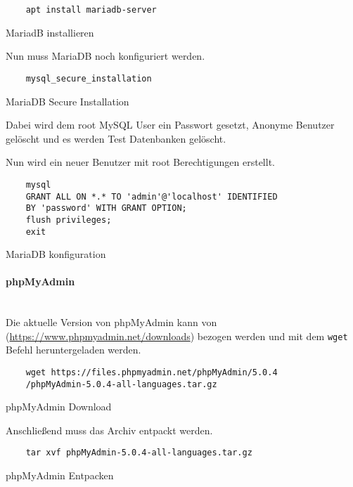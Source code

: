 \begin{listing}[H]
  \begin{verbatim}
    apt install mariadb-server
  \end{verbatim}
  \caption{MariadB installieren}
\end{listing}

Nun muss MariaDB noch konfiguriert werden.

\begin{listing}[H]
  \begin{verbatim}
    mysql_secure_installation
  \end{verbatim}
  \caption{MariaDB Secure Installation}
\end{listing}

Dabei wird dem root MySQL User ein Passwort gesetzt, Anonyme Benutzer gelöscht
und es werden Test Datenbanken gelöscht.

Nun wird ein neuer Benutzer mit root Berechtigungen erstellt.

\begin{listing}[H]
  \begin{verbatim}
    mysql
    GRANT ALL ON *.* TO 'admin'@'localhost' IDENTIFIED 
    BY 'password' WITH GRANT OPTION;
    flush privileges;
    exit
  \end{verbatim}
  \caption{MariaDB konfiguration}
\end{listing}

\paragraph{phpMyAdmin}\mbox{}\\

Die aktuelle Version von phpMyAdmin kann von
(\url{https://www.phpmyadmin.net/downloads}) bezogen werden und mit dem
\verb|wget| Befehl heruntergeladen werden.

\begin{listing}[H]
  \begin{verbatim}
    wget https://files.phpmyadmin.net/phpMyAdmin/5.0.4
    /phpMyAdmin-5.0.4-all-languages.tar.gz
  \end{verbatim}
  \caption{phpMyAdmin Download}
\end{listing}

Anschließend muss das Archiv entpackt werden.

\begin{listing}[H]
  \begin{verbatim}
    tar xvf phpMyAdmin-5.0.4-all-languages.tar.gz
  \end{verbatim}
  \caption{phpMyAdmin Entpacken}
\end{listing}

